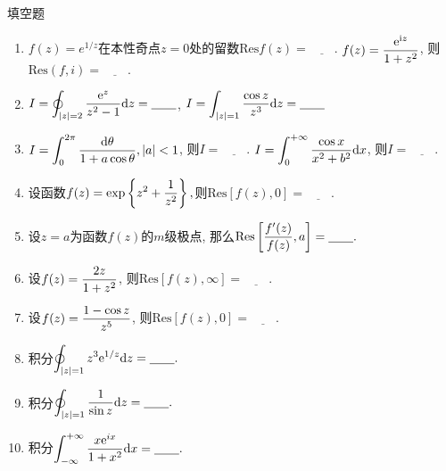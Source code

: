 \begin{yyEx}
	填空题
	\begin{enumerate}
		\item $f(z) = e^{1/z}$在本性奇点$z = 0$处的留数$\mathrm{Res}f(z) = \underline{\quad\quad}$. $\begin{lgathered}
			f(z) = \frac{\mathrm{e}^{\mathrm{i}z}}{1+z^2}
		\end{lgathered}$, 则$\mathrm{Res}(f,i) = \underline{\quad\quad}.$
		\item $\begin{lgathered}
			I = \oint_{\abs{z} = 2}\frac{\mathrm{e}^z}{z^2-1}\mathrm{d}z = \underline{\quad\quad}
		\end{lgathered}$, $\begin{lgathered}
		I = \int_{\abs{z} = 1}\frac{\cos z}{z^3}\mathrm{d}z = \underline{\quad\quad}
		\end{lgathered}$
		\item $\begin{lgathered}
			I = \int_{0}^{2\pi}\frac{\mathrm{d}\theta}{1+a\cos\theta}, \abs{a}<1
		\end{lgathered}$, 则$I = \underline{\quad\quad}$. $\begin{lgathered}
		I = \int_{0}^{+\infty}\frac{\cos x}{x^2+b^2}\mathrm{d}x
		\end{lgathered}$, 则$I = \underline{\quad\quad}$.
		\item 设函数$\begin{lgathered}
			f(z) = \exp\left\{ z^2 + \frac{1}{z^2} \right\}, 
		\end{lgathered}$则$\mathrm{Res}[f(z),0] = \underline{\quad\quad}.$
		\item 设$z = a$为函数$f(z)$的$m$级极点, 那么$\begin{lgathered}
			\mathrm{Res}\left[ \frac{f'(z)}{f(z)},a \right]= \underline{\quad\quad}.
		\end{lgathered}$
		\item 设$\begin{lgathered}
			f(z) = \frac{2z}{1+z^2}
		\end{lgathered}$, 则$\mathrm{Res}[f(z),\infty] = \underline{\quad\quad}.$
		\item 设$\begin{lgathered}
			f(z) = \frac{1-\cos z}{z^5}
		\end{lgathered}$, 则$\mathrm{Res}[f(z),0] = \underline{\quad\quad}.$
		\item 积分$\begin{lgathered}
			\oint_{\abs{z} = 1} z^3\mathrm{e}^{1/z}\mathrm{d}z = \underline{\quad\quad}.
		\end{lgathered}$
		\item 积分$\begin{lgathered}
		\oint_{\abs{z} = 1} \frac{1}{\sin z}\mathrm{d}z = \underline{\quad\quad}.
		\end{lgathered}$
		\item 积分$\begin{lgathered}
		\int_{-\infty}^{+\infty} \frac{x\mathrm{e}^{ix}}{1+x^2}\mathrm{d}x = \underline{\quad\quad}.
		\end{lgathered}$
	\end{enumerate}
\end{yyEx}

